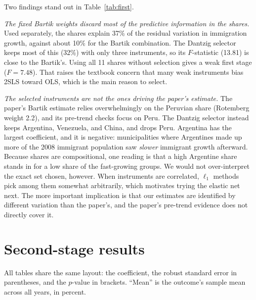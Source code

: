 \documentclass[11pt]{article}
\begin{document}
Two findings stand out in Table~\ref{tab:first}.

\emph{The fixed Bartik weights discard most of the predictive information in the shares.}
Used separately, the shares explain 37\% of the residual variation in immigration growth,
against about 10\% for the Bartik combination. The Dantzig selector keeps most of this
(32\%) with only three instruments, so its $F$-statistic (13.81) is close to the Bartik's.
Using all 11 shares without selection gives a weak first stage ($F = 7.48$). That raises
the textbook concern that many weak instruments bias 2SLS toward OLS, which is the main
reason to select.

\emph{The selected instruments are not the ones driving the paper's estimate.} The paper's
Bartik estimate relies overwhelmingly on the Peruvian share (Rotemberg weight 2.2), and its
pre-trend checks focus on Peru. The Dantzig selector instead keeps Argentina, Venezuela,
and China, and drops Peru. Argentina has the largest coefficient, and it is negative:
municipalities where Argentines made up more of the 2008 immigrant population saw
\emph{slower} immigrant growth afterward. Because shares are compositional, one reading is
that a high Argentine share stands in for a low share of the fast-growing groups. We would
not over-interpret the exact set chosen, however. When instruments are correlated, $\ell_1$
methods pick among them somewhat arbitrarily, which motivates trying the elastic net next.
The more important implication is that our estimates are identified by different
variation than the paper's, and the paper's pre-trend evidence does not directly cover it.

\section{Second-stage results}

All tables share the same layout: the coefficient, the robust standard error in
parentheses, and the $p$-value in brackets. ``Mean'' is the outcome's sample mean across
all years, in percent.
\end{document}
